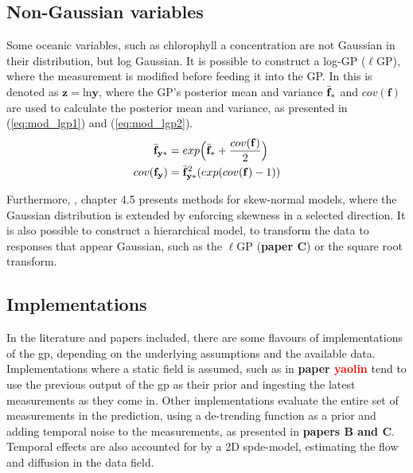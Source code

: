 \subsection{Non-Gaussian variables}
Some oceanic variables, such as chlorophyll a concentration are not Gaussian in their distribution, but log Gaussian. It is possible to construct a log-GP ($\ell$GP), where the measurement is modified before feeding it into the GP. In \cite{kemna2018multi} this is denoted as $\mathbf{z} = \text{ln} \mathbf{y}$, where the GP's posterior mean and variance $\Bar{\mathbf{f}}_*$ and $cov(\mathbf{f})$ are used to calculate the posterior mean and variance, as presented in (\ref{eq:mod_lgp1}) and (\ref{eq:mod_lgp2}). 
\begin{align}
    \label{eq:mod_lgp1}
    \Bar{\mathbf{f}}_{\mathbf{y}*} &= exp\Big(\Bar{\mathbf{f}}_* + \frac{cov(\mathbf{f})}{2}\Big) \\ 
    \label{eq:mod_lgp2}
    cov(\mathbf{f}_{\mathbf{y}}) &= \Bar{\mathbf{f}}_{\mathbf{y}*}^2(exp(cov(\mathbf{f})-1))
\end{align}

Furthermore, \textcite{eidsvik2015value}, chapter 4.5 presents methods for skew-normal models, where the Gaussian distribution is extended by enforcing skewness in a selected direction. It is also possible to construct a hierarchical model, to transform the data to responses that appear Gaussian, such as the $\ell$GP\cite{low2009multi,kemna2016adaptive} (\textbf{paper C}) or the square root transform. 



\subsection{Implementations}
In the literature and papers included, there are some flavours of implementations of the \acrshort{gp}, depending on the underlying assumptions and the available data. Implementations where a static field is assumed\cite{low2009multi,kemna2016adaptive,fossum2019toward}, such as in \textbf{paper  \textcolor{red}{yaolin}} tend to use the previous output of the \acrshort{gp} as their prior and ingesting the latest measurements as they come in. Other implementations evaluate the entire set of measurements in the prediction, using a de-trending function as a prior and adding temporal noise to the measurements, as presented in \textbf{papers B and C}. Temporal effects are also accounted for by a 2D \acrshort{spde}-model\cite{berget2022adaptive}, estimating the flow and diffusion in the data field. 

